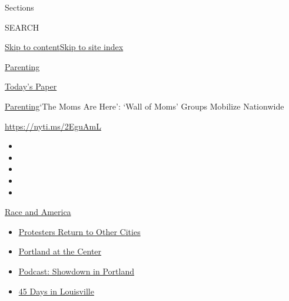 Sections

SEARCH

\protect\hyperlink{site-content}{Skip to
content}\protect\hyperlink{site-index}{Skip to site index}

\href{https://www.nytimes.com/section/parenting}{Parenting}

\href{https://myaccount.nytimes.com/auth/login?response_type=cookie\&client_id=vi}{}

\href{https://www.nytimes.com/section/todayspaper}{Today's Paper}

\href{/section/parenting}{Parenting}\textbar{}`The Moms Are Here': `Wall
of Moms' Groups Mobilize Nationwide

\url{https://nyti.ms/2EguAmL}

\begin{itemize}
\item
\item
\item
\item
\item
\end{itemize}

\href{https://www.nytimes.com/news-event/george-floyd-protests-minneapolis-new-york-los-angeles?action=click\&pgtype=Article\&state=default\&region=TOP_BANNER\&context=storylines_menu}{Race
and America}

\begin{itemize}
\tightlist
\item
  \href{https://www.nytimes.com/2020/07/26/us/protests-portland-seattle-trump.html?action=click\&pgtype=Article\&state=default\&region=TOP_BANNER\&context=storylines_menu}{Protesters
  Return to Other Cities}
\item
  \href{https://www.nytimes.com/2020/07/24/us/portland-oregon-protests-white-race.html?action=click\&pgtype=Article\&state=default\&region=TOP_BANNER\&context=storylines_menu}{Portland
  at the Center}
\item
  \href{https://www.nytimes.com/2020/07/23/podcasts/the-daily/portland-protests.html?action=click\&pgtype=Article\&state=default\&region=TOP_BANNER\&context=storylines_menu}{Podcast:
  Showdown in Portland}
\item
  \href{https://www.nytimes.com/interactive/2020/07/16/us/black-lives-matter-protests-louisville-breonna-taylor.html?action=click\&pgtype=Article\&state=default\&region=TOP_BANNER\&context=storylines_menu}{45
  Days in Louisville}
\end{itemize}

